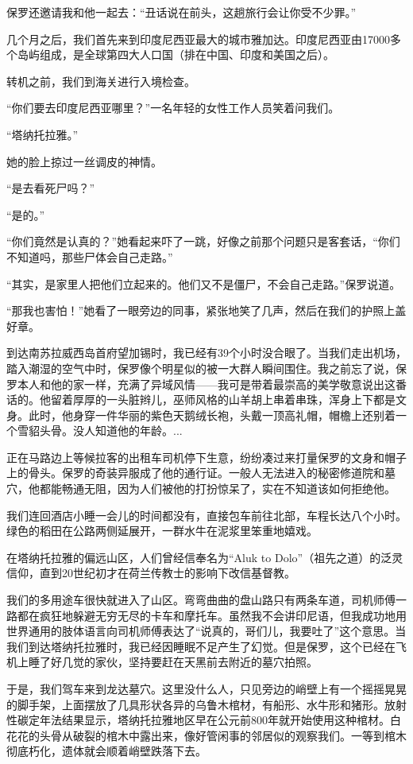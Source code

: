 \documentclass[12pt,oneside]{book}
\begin{document}
保罗还邀请我和他一起去：“丑话说在前头，这趟旅行会让你受不少罪。”

几个月之后，我们首先来到印度尼西亚最大的城市雅加达。印度尼西亚由17000多个岛屿组成，是全球第四大人口国（排在中国、印度和美国之后）。

转机之前，我们到海关进行入境检查。

“你们要去印度尼西亚哪里？”一名年轻的女性工作人员笑着问我们。

“塔纳托拉雅。”

她的脸上掠过一丝调皮的神情。

“是去看死尸吗？”

“是的。”

“你们竟然是认真的？”她看起来吓了一跳，好像之前那个问题只是客套话，“你们不知道吗，那些尸体会自己走路。”

“其实，是家里人把他们立起来的。他们又不是僵尸，不会自己走路。”保罗说道。

“那我也害怕！”她看了一眼旁边的同事，紧张地笑了几声，然后在我们的护照上盖好章。

到达南苏拉威西岛首府望加锡时，我已经有39个小时没合眼了。当我们走出机场，踏入潮湿的空气中时，保罗像个明星似的被一大群人瞬间围住。我之前忘了说，保罗本人和他的家一样，充满了异域风情——我可是带着最崇高的美学敬意说出这番话的。他留着厚厚的一头脏辫儿，巫师风格的山羊胡上串着串珠，浑身上下都是文身。此时，他身穿一件华丽的紫色天鹅绒长袍，头戴一顶高礼帽，帽檐上还别着一个雪貂头骨。没人知道他的年龄。...

正在马路边上等候拉客的出租车司机停下生意，纷纷凑过来打量保罗的文身和帽子上的骨头。保罗的奇装异服成了他的通行证。一般人无法进入的秘密修道院和墓穴，他都能畅通无阻，因为人们被他的打扮惊呆了，实在不知道该如何拒绝他。

我们连回酒店小睡一会儿的时间都没有，直接包车前往北部，车程长达八个小时。绿色的稻田在公路两侧延展开，一群水牛在泥浆里笨重地嬉戏。

在塔纳托拉雅的偏远山区，人们曾经信奉名为“Aluk to Dolo”（祖先之道）的泛灵信仰，直到20世纪初才在荷兰传教士的影响下改信基督教。

我们的多用途车很快就进入了山区。弯弯曲曲的盘山路只有两条车道，司机师傅一路都在疯狂地躲避无穷无尽的卡车和摩托车。虽然我不会讲印尼语，但我成功地用世界通用的肢体语言向司机师傅表达了“说真的，哥们儿，我要吐了”这个意思。当我们到达塔纳托拉雅时，我已经因睡眠不足产生了幻觉。但是保罗，这个已经在飞机上睡了好几觉的家伙，坚持要赶在天黑前去附近的墓穴拍照。

于是，我们驾车来到龙达墓穴。这里没什么人，只见旁边的峭壁上有一个摇摇晃晃的脚手架，上面摆放了几具形状各异的乌鲁木棺材，有船形、水牛形和猪形。放射性碳定年法结果显示，塔纳托拉雅地区早在公元前800年就开始使用这种棺材。白花花的头骨从破裂的棺木中露出来，像好管闲事的邻居似的观察我们。一等到棺木彻底朽化，遗体就会顺着峭壁跌落下去。
\end{document}
